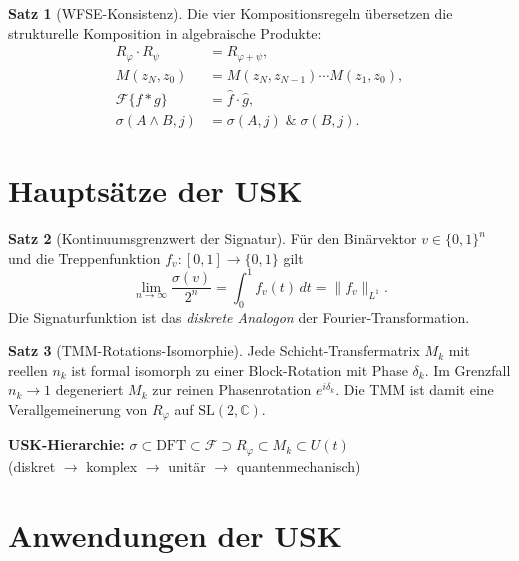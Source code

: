 ﻿\documentclass[a4paper,12pt]{scrreprt}
\theoremstyle{definition}
\newtheorem{satz}{Satz}[section]
\begin{document}
\begin{satz}[WFSE-Konsistenz]
  Die vier Kompositionsregeln übersetzen die strukturelle Komposition
  in algebraische Produkte:
  \begin{align*}
    R_\varphi \cdot R_\psi &= R_{\varphi+\psi}, \\
    M(z_N,z_0) &= M(z_N,z_{N-1})\cdots M(z_1,z_0), \\
    \mathcal{F}\{f*g\} &= \hat f \cdot \hat g, \\
    \sigma(A\wedge B,j) &= \sigma(A,j)\;\&\;\sigma(B,j).
  \end{align*}
\end{satz}

\section{Hauptsätze der USK}
\label{sec:nf1_saetze}

\begin{satz}[Kontinuumsgrenzwert der Signatur]
  Für den Binärvektor $v\in\{0,1\}^n$ und die Treppenfunktion
  $f_v:[0,1]\to\{0,1\}$ gilt
  \[
    \lim_{n\to\infty}\frac{\sigma(v)}{2^n} = \int_0^1 f_v(t)\,dt = \|f_v\|_{L^1}.
  \]
  Die Signaturfunktion ist das \emph{diskrete Analogon} der Fourier-Transformation.
\end{satz}

\begin{satz}[TMM-Rotations-Isomorphie]
  Jede Schicht-Transfermatrix $M_k$ mit reellen $n_k$ ist formal isomorph
  zu einer Block-Rotation mit Phase $\delta_k$. Im Grenzfall
  $n_k\to 1$ degeneriert $M_k$ zur reinen Phasenrotation $e^{i\delta_k}$.
  Die TMM ist damit eine Verallgemeinerung von $R_\varphi$ auf
  $\mathrm{SL}(2,\mathbb{C})$.
\end{satz}

\begin{infobox}
\textbf{USK-Hierarchie:}
$\sigma \subset \mathrm{DFT} \subset \mathcal{F} \supset R_\varphi \subset M_k \subset U(t)$ \\
(diskret $\to$ komplex $\to$ unitär $\to$ quantenmechanisch)
\end{infobox}

\section{Anwendungen der USK}
\label{sec:nf1_anwendungen}
\end{document}
